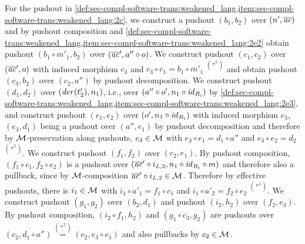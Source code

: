 \begin{enumerate}
\begin{center}
	\end{center} 
  For the pushout in \cref{def:sec-compl-software-trans:weakened_lang,item:sec-compl-software-trans:weakened_lang:2c}, we construct a pushout $(b_1,b_2)$ over $(n',\overline{\mathit{ac}})$ and by pushout composition and \cref{def:sec-compl-software-trans:weakened_lang,item:sec-compl-software-trans:weakened_lang:2e2} obtain pushout $(b_1 \circ \overline{m}'_1,b_2)$ over $(\overline{\mathit{ac}}',a'' \circ o)$.
  We construct pushout $(c_1,c_2)$ over $(\overline{\mathit{ac}}',o)$ with induced morphism $c_3$ and $c_3 \circ c_1=b_1 \circ \overline{m}'_1$ $^{(*^3)}$ and obtain pushout $(c_3,b_2)$ over $(c_2,a'')$ by pushout decomposition.
  We construct pushout $(d_1,d_2)$ over $(\mathit{der}(t'_2),n_1)$, i.e., over $(a'' \circ o',n_1 \circ \mathit{id}_{R_i})$ by \cref{def:sec-compl-software-trans:weakened_lang,item:sec-compl-software-trans:weakened_lang:2e3}, and construct pushout $(e_1,e_2)$ over $(o',n_1 \circ \mathit{id}_{R_i})$ with induced morphism $e_3$, $(e_3,d_1)$ being a pushout over $(a'',e_1)$ by pushout decomposition and therefore by ${\cal M}$-preservation along pushouts, $e_3 \in {\cal M}$ with $e_3 \circ e_1=d_1 \circ a''$ and $e_3 \circ e_2=d_2$ $^{(*^2)}$.
  We construct pushout $(f_1,f_2)$ over $(c_2,e_1)$.
  By pushout composition, $(f_1 \circ c_1,f_2 \circ e_2)$ is a pushout over $(\overline{\mathit{ac}}' \circ i_{L,2},n_1 \circ \mathit{id}_{R_i} \circ m)$ and therefore also a pullback, since by ${\cal M}$-composition $\overline{\mathit{ac}}' \circ i_{L,2} \in {\cal M}$.
  Therefore by effective pushouts, there is $i_1 \in {\cal M}$ with $i_1 \circ a'_1=f_1 \circ c_1$ and $i_1 \circ a'_2=f_2 \circ e_2$ $^{(*^4)}$.
  We construct pushout $(g_1,g_2)$ over $(b_2,d_1)$ and pushout $(i_2,h_2)$ over $(f_2,e_3)$.
  By pushout composition, $(i_2 \circ f_1,h_2)$ and $(g_1 \circ c_3,g_2)$ are pushouts over $(c_2,d_1 \circ a'') \stackrel{(*^2)}{=} (c_2,e_3 \circ e_1)$ and also pullbacks by $c_2 \in {\cal M}$.

\end{enumerate}
